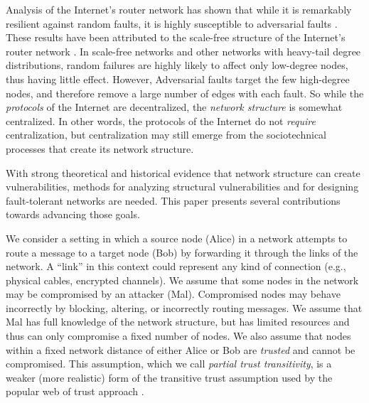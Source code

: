 \documentclass{sig-alternate-05-2015}
\begin{document}
Analysis of the Internet's router network has shown that while it is remarkably
resilient against random faults,
it is highly susceptible to adversarial faults \cite{albert_error_2000}.
These results have been attributed to the scale-free structure of the Internet's
router network
\cite{barabasi_emergence_1999,barabasi_scale-free_2009}.
In scale-free networks and other networks with heavy-tail degree distributions,
random failures are highly likely to
affect only low-degree nodes, thus having
little effect.
However, Adversarial faults target the few high-degree nodes,
and therefore remove a large number of edges with each fault.
So while the {\em protocols} of the Internet are decentralized,
the {\em network structure} is somewhat centralized. 
In other words, the protocols of the Internet do not {\em require}
centralization, but centralization may still emerge from the sociotechnical
processes that create its network structure.

With strong theoretical and historical evidence that network structure
can create vulnerabilities,
methods for analyzing structural vulnerabilities and for designing
fault-tolerant networks are needed.
This paper presents several contributions towards advancing those goals.

We consider a setting in which a source node (Alice)
in a network attempts to route a message
to a target node (Bob) by forwarding it through the links of the network.
A ``link'' in this context could represent any kind of connection
(e.g., physical cables, encrypted channels).
We assume that some nodes in the network may be compromised by an attacker
(Mal).
Compromised nodes may behave incorrectly by blocking, altering,
or incorrectly routing messages.
We assume that Mal has full knowledge of the network structure, but has
limited resources and thus can only compromise a fixed number of nodes.
We also assume that nodes within a fixed network
distance of either Alice or Bob are
{\em trusted}
and cannot be compromised.
This assumption,
which we call
{\em partial trust transitivity},
is a weaker (more realistic) form of the transitive
trust assumption used by the popular 
web of trust approach
\cite{zimmermann_official_1995,ferguson_practical_2003}.
\end{document}
